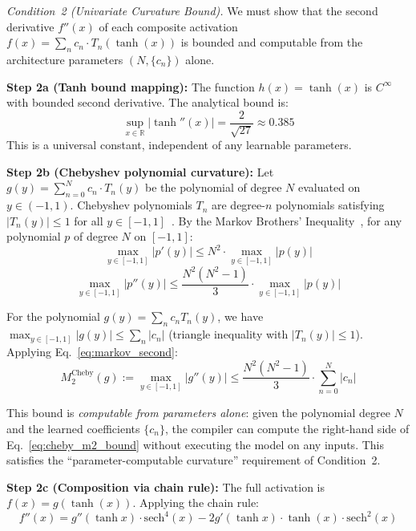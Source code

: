 \vspace{2pt}
\noindent\textit{Condition~2 (Univariate Curvature Bound).}
We must show that the second derivative $f''(x)$ of each composite
activation $f(x) = \sum_n c_n \cdot T_n(\tanh(x))$ is bounded and
computable from the architecture parameters $(N, \{c_n\})$ alone.

\textbf{Step 2a (Tanh bound mapping):}
The function $h(x) = \tanh(x)$ is $C^\infty$ with bounded second
derivative. The analytical bound is:
\begin{equation}
\sup_{x \in \mathbb{R}} |\tanh''(x)| = \frac{2}{\sqrt{27}} \approx 0.385
\label{eq:tanh_m2}
\end{equation}
This is a universal constant, independent of any learnable parameters.

\textbf{Step 2b (Chebyshev polynomial curvature):}
Let $g(y) = \sum_{n=0}^{N} c_n \cdot T_n(y)$ be the polynomial of degree
$N$ evaluated on $y \in (-1,1)$. Chebyshev polynomials $T_n$ are
degree-$n$ polynomials satisfying $|T_n(y)| \leq 1$ for all $y \in
[-1,1]$~\cite{mason2002chebyshev}. By the Markov Brothers'
Inequality~\cite{markov1890limit}, for any polynomial $p$ of degree $N$
on $[-1,1]$:
\begin{equation}
\max_{y \in [-1,1]} |p'(y)| \leq N^2 \cdot \max_{y \in [-1,1]} |p(y)|
\label{eq:markov_first}
\end{equation}
\begin{equation}
\max_{y \in [-1,1]} |p''(y)| \leq \frac{N^2(N^2-1)}{3} \cdot
\max_{y \in [-1,1]} |p(y)|
\label{eq:markov_second}
\end{equation}

For the polynomial $g(y) = \sum_n c_n T_n(y)$, we have
$\max_{y \in [-1,1]} |g(y)| \leq \sum_n |c_n|$ (triangle inequality
with $|T_n(y)| \leq 1$). Applying Eq.~\ref{eq:markov_second}:
\begin{equation}
M_2^{\text{Cheby}}(g) := \max_{y \in [-1,1]} |g''(y)| \leq
\frac{N^2(N^2-1)}{3} \cdot \sum_{n=0}^{N} |c_n|
\label{eq:cheby_m2_bound}
\end{equation}

This bound is \textit{computable from parameters alone}: given the
polynomial degree $N$ and the learned coefficients $\{c_n\}$, the compiler
can compute the right-hand side of Eq.~\ref{eq:cheby_m2_bound} without
executing the model on any inputs. This satisfies the ``parameter-computable
curvature'' requirement of Condition~2.

\textbf{Step 2c (Composition via chain rule):}
The full activation is $f(x) = g(\tanh(x))$. Applying the chain rule:
\begin{equation}
f''(x) = g''(\tanh x) \cdot \text{sech}^4(x) - 2g'(\tanh x) \cdot
\tanh(x) \cdot \text{sech}^2(x)
\label{eq:cheby_f_second}
\end{equation}

